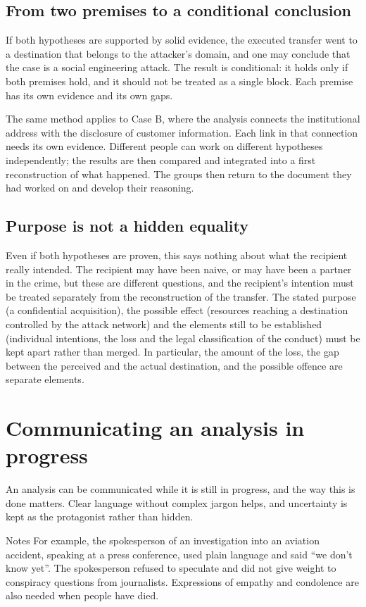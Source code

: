 \subsection{From two premises to a conditional conclusion}
If both hypotheses are supported by solid evidence, the executed transfer went to a destination that belongs to the attacker's domain, and one may conclude that the case is a social engineering attack. The result is conditional: it holds only if both premises hold, and it should not be treated as a single block. Each premise has its own evidence and its own gaps.

The same method applies to Case B, where the analysis connects the institutional address with the disclosure of customer information. Each link in that connection needs its own evidence. Different people can work on different hypotheses independently; the results are then compared and integrated into a first reconstruction of what happened. The groups then return to the document they had worked on and develop their reasoning.

\subsection{Purpose is not a hidden equality}
Even if both hypotheses are proven, this says nothing about what the recipient really intended. The recipient may have been naive, or may have been a partner in the crime, but these are different questions, and the recipient's intention must be treated separately from the reconstruction of the transfer. The stated purpose (a confidential acquisition), the possible effect (resources reaching a destination controlled by the attack network) and the elements still to be established (individual intentions, the loss and the legal classification of the conduct) must be kept apart rather than merged. In particular, the amount of the loss, the gap between the perceived and the actual destination, and the possible offence are separate elements.

\section{Communicating an analysis in progress}
An analysis can be communicated while it is still in progress, and the way this is done matters. Clear language without complex jargon helps, and uncertainty is kept as the protagonist rather than hidden.

\begin{nota}{Notes}
	For example, the spokesperson of an investigation into an aviation accident, speaking at a press conference, used plain language and said ``we don't know yet''. The spokesperson refused to speculate and did not give weight to conspiracy questions from journalists. Expressions of empathy and condolence are also needed when people have died.
\end{nota}

